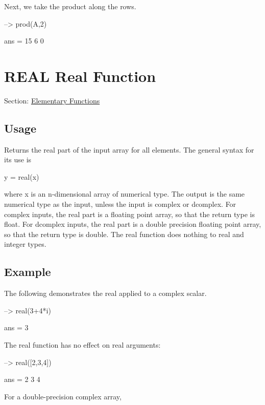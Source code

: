 Next, we take the product along the rows.


\begin{DoxyVerbInclude}
--> prod(A,2)

ans = 
 15 
  6 
  0 
\end{DoxyVerbInclude}
 \hypertarget{elementary_real}{}\section{R\-E\-A\-L Real Function}\label{elementary_real}
Section\-: \hyperlink{sec_elementary}{Elementary Functions} \hypertarget{vtkwidgets_vtkxyplotwidget_Usage}{}\subsection{Usage}\label{vtkwidgets_vtkxyplotwidget_Usage}
Returns the real part of the input array for all elements. The general syntax for its use is \begin{DoxyVerb}   y = real(x)
\end{DoxyVerb}
 where {\ttfamily x} is an {\ttfamily n}-\/dimensional array of numerical type. The output is the same numerical type as the input, unless the input is {\ttfamily complex} or {\ttfamily dcomplex}. For {\ttfamily complex} inputs, the real part is a floating point array, so that the return type is {\ttfamily float}. For {\ttfamily dcomplex} inputs, the real part is a double precision floating point array, so that the return type is {\ttfamily double}. The {\ttfamily real} function does nothing to real and integer types. \hypertarget{variables_struct_Example}{}\subsection{Example}\label{variables_struct_Example}
The following demonstrates the {\ttfamily real} applied to a complex scalar.


\begin{DoxyVerbInclude}
--> real(3+4*i)

ans = 
 3 
\end{DoxyVerbInclude}


The {\ttfamily real} function has no effect on real arguments\-:


\begin{DoxyVerbInclude}
--> real([2,3,4])

ans = 
 2 3 4 
\end{DoxyVerbInclude}


For a double-\/precision complex array,



